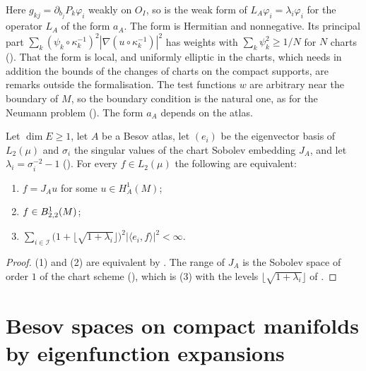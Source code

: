 Here $g_{kj} = \partial_{b_j} P_k \varphi_i$ weakly on $O_I$, so  is the
weak form of $L_A \varphi_i = \lambda_i \varphi_i$ for the operator $L_A$ of the form $a_A$. The
form is Hermitian and nonnegative. Its principal part
$\sum_k (\psi_k \circ \kappa_k^{-1})^2 |\nabla (u \circ \kappa_k^{-1})|^2$ has weights with
$\sum_k \psi_k^2 \geq 1/N$ for $N$ charts (). That the form is
local, and uniformly elliptic in the charts, which needs in addition the bounds of the changes of
charts on the compact supports, are remarks outside the formalisation.
The test functions $w$ are arbitrary near the boundary of $M$, so the boundary
condition is the natural one, as for the Neumann problem (). The form
$a_A$ depends on the atlas.

\begin{corollary}
\label{cor:chart-sobolev-spectral}
\leanok
{}
Let $\dim E \geq 1$, let $A$ be a Besov atlas, let $(e_i)$ be the eigenvector basis of
$L_2(\mu)$ and $\sigma_i$ the singular values of the chart Sobolev embedding $J_A$, and let
$\lambda_i = \sigma_i^{-2} - 1$ (). For every $f \in L_2(\mu)$ the
following are equivalent:
\begin{enumerate}
  \item $f = J_A u$ for some $u \in H^1_A(M)$;
  \item $f \in B^{1}_{2,2}(M)$;
  \item $\sum_{i \in \mathcal{I}} \bigl(1 + \lfloor \sqrt{1 + \lambda_i} \rfloor\bigr)^2
    |\langle e_i, f \rangle|^2 < \infty$.
\end{enumerate}
\end{corollary}

\begin{proof}
\leanok
(1) and (2) are equivalent by . The range of $J_A$ is the Sobolev
space of order $1$ of the chart scheme (), which is (3)
with the levels $\lfloor \sqrt{1 + \lambda_i} \rfloor$ of .
\end{proof}

\section{Besov spaces on compact manifolds by eigenfunction expansions}
\label{sec:spectral-besov-manifold}

